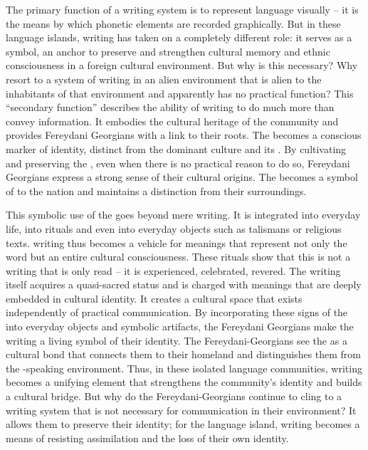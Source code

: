 \documentclass[output=paper,colorlinks,citecolor=brown,arabicfont,georgian]{langscibook}
\begin{document}
The primary function of a writing system is to represent language visually -- it is the means by which phonetic elements are recorded graphically. But in these  language islands, writing has taken on a completely different role: it serves as a symbol, an anchor to preserve and strengthen cultural memory and ethnic consciousness in a foreign cultural environment. But why is this necessary? Why resort to a system of writing in an alien environment that is alien to the inhabitants of that environment and apparently has no practical function? This ``secondary function'' describes the ability of writing to do much more than convey information. It embodies the cultural heritage of the community and provides Fereydani Georgians with a link to their roots. The  becomes a conscious marker of identity, distinct from the dominant  culture and its  . By cultivating and preserving the  , even when there is no practical reason to do so, Fereydani Georgians express a strong sense of their cultural origins. The  becomes a symbol of  to the  nation and maintains a distinction from their surroundings. 

This symbolic use of the  goes beyond mere writing. It is integrated into everyday life, into rituals and even into everyday objects such as talismans or religious texts.  writing thus becomes a vehicle for meanings that represent not only the word but an entire cultural consciousness. These rituals show that this is not a writing that is only read -- it is experienced, celebrated, revered. The writing itself acquires a quasi-sacred status and is charged with meanings that are deeply embedded in cultural identity. It creates a cultural space that exists independently of practical communication. By incorporating these signs of the   into everyday objects and symbolic artifacts, the Fereydani Georgians make the writing a living symbol of their identity. The Fereydani-Georgians see the   as a cultural bond that connects them to their homeland and distinguishes them from the -speaking environment. Thus, in these isolated language communities, writing becomes a unifying element that strengthens the community's identity and builds a cultural bridge. But why do the Fereydani-Georgians continue to cling to a writing system that is not necessary for communication in their environment? It allows them to preserve their identity; for the language island,  writing becomes a means of resisting assimilation and the loss of their own identity.
\end{document}
